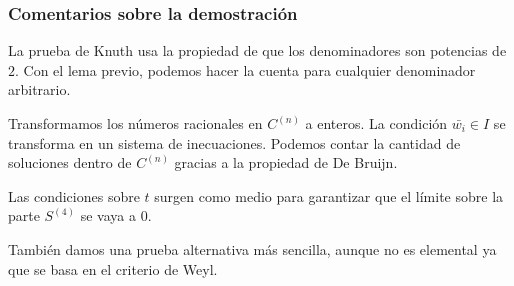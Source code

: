 \documentclass[t, 10pt, mathserif]{beamer}
\begin{document}

\begin{frame}
  \frametitle{Comentarios sobre la demostración}

  La prueba de Knuth usa la propiedad de que los denominadores son potencias de $2$. Con el lema previo, podemos hacer la cuenta para cualquier denominador arbitrario.
  \pause

  Transformamos los números racionales en $C^{(n)}$ a enteros. La condición $\bar{w_i} \in I$ se transforma en un sistema de inecuaciones. Podemos contar la cantidad de soluciones dentro de $C^{(n)}$ gracias a la propiedad de De Bruijn.
  \pause

  Las condiciones sobre $t$ surgen como medio para garantizar que el límite sobre la parte $S^{(4)}$ se vaya a $0$.
  \pause

  También damos una prueba alternativa más sencilla, aunque no es elemental ya que se basa en el criterio de Weyl.

\end{frame}








\end{document}
